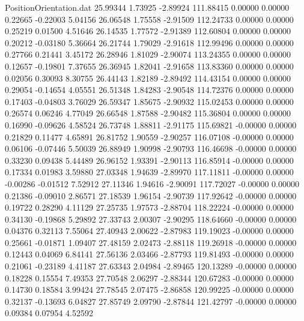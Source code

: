 \begin{filecontents}{PositionOrientation.dat}
  25.99344    1.73925   -2.89924   111.88415    0.00000    0.00000    0.22665   -0.22003    5.04156
  26.06548    1.75558   -2.91509   112.24733    0.00000    0.00000    0.25219    0.01500    4.51646
  26.14535    1.77572   -2.91389   112.60804    0.00000    0.00000    0.20212   -0.03180    5.36664
  26.21744    1.79029   -2.91618   112.99496    0.00000    0.00000    0.27766    0.21441    3.45172
  26.28946    1.81029   -2.90074   113.24355    0.00000    0.00000    0.12657   -0.19801    7.37655
  26.36945    1.82041   -2.91658   113.83360    0.00000    0.00000    0.02056    0.30093    8.30755
  26.44143    1.82189   -2.89492   114.43154    0.00000    0.00000    0.29054   -0.14654    4.05551
  26.51348    1.84283   -2.90548   114.72376    0.00000    0.00000    0.17403   -0.04803    3.76029
  26.59347    1.85675   -2.90932   115.02453    0.00000    0.00000    0.26574    0.06246    4.77049
  26.66548    1.87588   -2.90482   115.36804    0.00000    0.00000    0.16990   -0.09626    4.58524
  26.73748    1.88811   -2.91175   115.69821   -0.00000    0.00000    0.21829    0.11477    4.65891
  26.81752    1.90559   -2.90257   116.07108   -0.00000    0.00000    0.06106   -0.07446    5.50039
  26.88949    1.90998   -2.90793   116.46698   -0.00000    0.00000    0.33230    0.09438    5.44489
  26.96152    1.93391   -2.90113   116.85914   -0.00000    0.00000    0.17334    0.01983    3.59880
  27.03348    1.94639   -2.89970   117.11811   -0.00000    0.00000   -0.00286   -0.01512    7.52912
  27.11346    1.94616   -2.90091   117.72027   -0.00000    0.00000    0.21386   -0.09010    2.86571
  27.18539    1.96154   -2.90739   117.92642   -0.00000    0.00000    0.19722    0.28290    4.11129
  27.25735    1.97573   -2.88704   118.22224   -0.00000    0.00000    0.34130   -0.19868    5.29892
  27.33743    2.00307   -2.90295   118.64660   -0.00000    0.00000    0.04376    0.32113    7.55064
  27.40943    2.00622   -2.87983   119.19023   -0.00000    0.00000    0.25661   -0.01871    1.09407
  27.48159    2.02473   -2.88118   119.26918   -0.00000    0.00000    0.12443    0.04069    6.84141
  27.56136    2.03466   -2.87793   119.81493   -0.00000    0.00000    0.21061   -0.23189    4.41187
  27.63343    2.04984   -2.89465   120.13289   -0.00000    0.00000    0.18228    0.15554    7.49353
  27.70548    2.06297   -2.88344   120.67283   -0.00000    0.00000    0.14730    0.18584    3.99424
  27.78545    2.07475   -2.86858   120.99225   -0.00000    0.00000    0.32137   -0.13693    6.04827
  27.85749    2.09790   -2.87844   121.42797   -0.00000    0.00000    0.09384    0.07954    4.52592

\end{filecontents}
